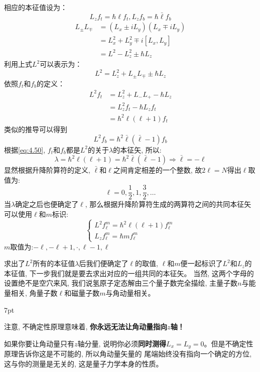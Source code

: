 \documentclass[a4paper,zihao=-4,linespread=1]{ctexrep}
\newenvironment{thinknote}{%
\def\FrameCommand{%
\hspace{1pt}%
{\color{BurlyWood}\vrule width 2pt}%
{\color{formalshade}\vrule width 4pt}%
\colorbox{formalshade}%
}%
\MakeFramed{\advance\hsize-\width\FrameRestore}%
\noindent\hspace{-4.55pt}%
\begin{adjustwidth}{}{7pt}%
\vspace{2pt}\vspace{2pt}%
}
{%
\vspace{2pt}\end{adjustwidth}\endMakeFramed%
}
\begin{document}
    相应的本征值设为：
    \[L_zf_t=\hbar \ell f_t,L_zf_b=\hbar \bar \ell f_b\]
    \begin{align*}
        L_\pm L_\mp&=\left(L_x\pm iL_y\right)\left(L_x\mp iL_y\right)\\
                   &=L_x^2+L_y^2\mp i\left[L_x,L_y\right]\\
                   &=L^2-L_z^2\pm \hbar L_z
    \end{align*}
    利用上式$L^2$可以表示为：
    \begin{equation}
        \label{eq:4.52}
        L^2=L_z^2+L_\pm L_\mp \pm \hbar L_z
    \end{equation}
    依照$f_t$和$f_b$的定义：
    \begin{align*}
        L^2f_t&=L_z^2+L_- L_+ - \hbar L_z\\
        &=L_z^2f_t-\hbar L_zf_t\\
        &=\hbar^2\ell\left(\ell+1\right)f_t
    \end{align*}
    类似的推导可以得到
    \[ L^2f_b=\hbar^2\bar \ell\left(\bar \ell-1\right)f_b\]
    根据\ref{eq:4.50}, $f_t$和$f_b$都是$L^2$的关于$\lambda$的本征矢, 所以:
    \[\lambda=\hbar^2\ell\left(\ell+1\right)=\hbar^2\bar \ell\left(\bar \ell-1\right)\Rightarrow\bar \ell=-\ell\]
    显然根据升降阶算符的定义, $\bar\ell $和$\ell$之间肯定相差的一个整数, 故$2\ell=N$得出$\ell $取值为:
    \[\ell=0,\frac{1}{2},1,\frac{3}{2},\ldots\]
    当$\lambda$确定之后也便确定了$\ell$, 那么根据升降阶算符生成的两算符之间的共同本征矢可以使用$\ell$和$m$标识:
    \begin{equation}
        \begin{cases}
            L^2f_\ell^m=\hbar^2\ell\left(\ell+1\right)f_\ell^m\\
            L_zf_\ell^m=\hbar m f_\ell^m
        \end{cases}
    \end{equation}
    $m$取值为:$-\ell,-\ell+1,\cdot,\ell-1,\ell$

    求出了$L^2$所有的本征值$\lambda$后我们便确定了$\ell$的取值, $\ell$和$m$便一起标识了$L^2$和$L_z$的本征值, 下一步我们就是要去求出对应的一组共同的本征矢。
    当然, 这两个字母的设置绝不是空穴来风, 我们说氢原子定态解由三个量子数完全描绘, 主量子数$n$与能量相关, 角量子数$\ell $和磁量子数$m$与角动量相关。

    \begin{thinknote}
        注意, 不确定性原理意味着, \textbf{你永远无法让角动量指向$z$轴！}

        \setlength\parindent{2em}如果你要让角动量只有$z$轴分量, 说明你必须\textbf{同时测得}$L_x=L_y=0$。但是不确定性原理告诉你这是不可能的, 所以角动量矢量的
        尾端始终没有指向一个确定的方位, 这与你的测量是无关的, 这是量子力学本身的性质。
    \end{thinknote}
\end{document}
